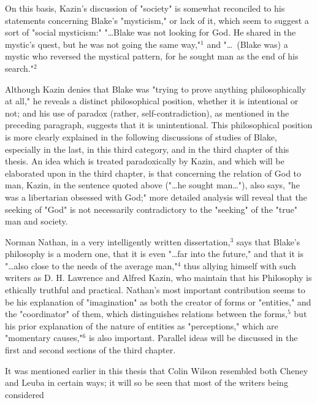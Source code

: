 \noindent On this basis, Kazin's discussion of "society" is somewhat reconciled
to his statements concerning Blake's "mysticism," or lack of it, which seem to suggest a sort of "social
mysticism:" "\dots Blake was not looking for God. He shared in the mystic's quest, but he was not going the same way,"$^{1}$
and "\dots \ (Blake was) a mystic who reversed the mystical pattern, for he sought man as the end of his search."$^{2}$\par
\vspace*{0.5\baselineskip}
Although Kazin denies that Blake was "trying to prove
anything philosophically at all," he reveals a distinct
philosophical position, whether it is intentional or not;
and his use of paradox (rather, self-contradiction), as mentioned
in the preceding paragraph, suggests that it is unintentional. This
philosophical position is more clearly explained in the following discussions
of studies of Blake, especially in the last, in this third category, and in the 
third chapter of this thesis. An idea which is treated paradoxically by Kazin, and which
will be elaborated upon in the third chapter, is that concerning the relation of
God to man, Kazin, in the sentence quoted above ("\dots he
sought man\dots"), also says, "he was a libertarian obsessed with God;"
more detailed analysis will reveal that the seeking of "God" is not necessarily contradictory
to the "seeking" of the "true" man and society.\par
\vspace*{0.5\baselineskip}
Norman Nathan, in a very intelligently written dissertation,$^{3}$ says that Blake's
philosophy is a modern one, that it is even "\dots far into the future," and that it is
"\dots also close to the needs of the average man,"$^{4}$ thus allying himself with
such writers as D. H. Lawrence and Alfred Kazin, who maintain that his Philosophy is ethically
truthful and practical. Nathan's most important contribution seems to be his explanation of
"imagination" as both the creator of forms or "entities," and the "coordinator" of them,
which distinguishes relations between the forms,$^{5}$ but his prior explanation of the 
nature of entities as "perceptions," which are "momentary causes,"$^{6}$ is also
important. Parallel ideas will be discussed in the first and second sections of the third chapter.\par
\vspace*{0.5\baselineskip}
It was mentioned earlier in this thesis that Colin
Wilson resembled both Cheney and Leuba in certain ways; it
will so be seen that most of the writers being considered
